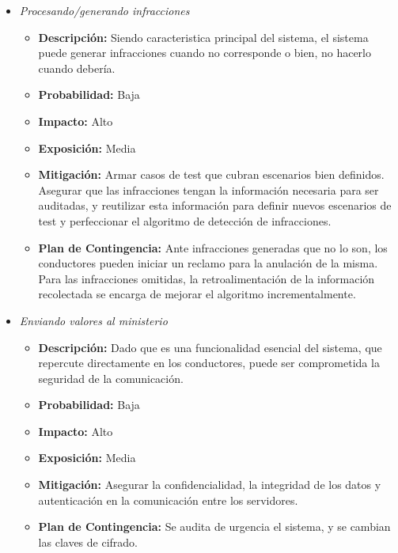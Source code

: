 \begin{itemize}

\item \textit{Procesando/generando infracciones}
\begin{itemize}
\item \textbf{Descripción:} Siendo caracteristica principal del sistema, el sistema puede generar infracciones cuando no corresponde o bien, no hacerlo cuando debería.
\item \textbf{Probabilidad:} Baja
\item \textbf{Impacto:} Alto
\item \textbf{Exposición:} Media
\item \textbf{Mitigación:} Armar casos de test que cubran escenarios bien definidos. Asegurar que las infracciones tengan la información necesaria para ser auditadas, y reutilizar esta información para definir nuevos escenarios de test y perfeccionar el algoritmo de detección de infracciones.
\item \textbf{Plan de Contingencia:} Ante infracciones generadas que no lo son, los conductores pueden iniciar un reclamo para la anulación de la misma. Para las infracciones omitidas, la retroalimentación de la información recolectada se encarga de mejorar el algoritmo incrementalmente.
\end{itemize}

\end{itemize}


\begin{itemize}

\item \textit{Enviando valores al ministerio}
\begin{itemize}
\item \textbf{Descripción:} Dado que es una funcionalidad esencial del sistema, que repercute directamente en los conductores, puede ser comprometida la seguridad de la comunicación.
\item \textbf{Probabilidad:} Baja
\item \textbf{Impacto:} Alto
\item \textbf{Exposición:} Media
\item \textbf{Mitigación:} Asegurar la confidencialidad, la integridad de los datos y autenticación en la comunicación entre los servidores.
\item \textbf{Plan de Contingencia:} Se audita de urgencia el sistema, y se cambian las claves de cifrado.
\end{itemize}

\end{itemize}
